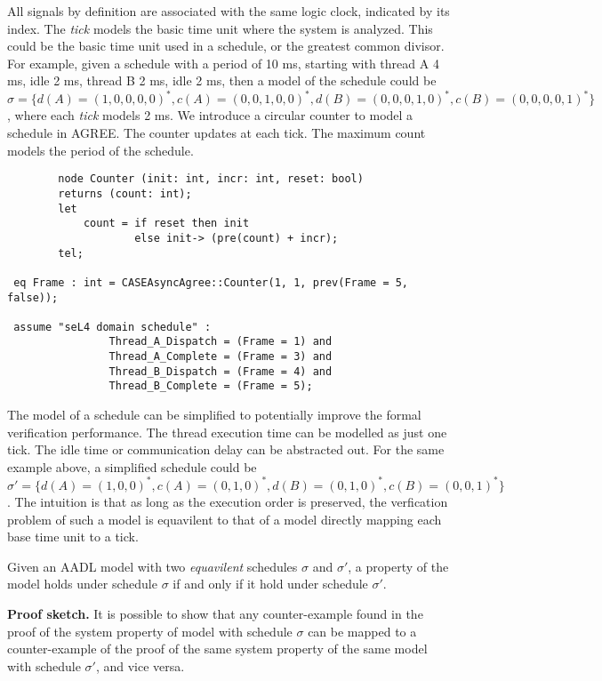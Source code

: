 All signals by definition are associated with the same logic clock, indicated by its index. The \emph{tick} models the basic time unit where the system is analyzed. This could be the basic time unit used in a schedule, or the greatest common divisor. For example, given a schedule with a period of 10 ms, starting with thread A 4 ms, idle 2 ms, thread B 2 ms, idle 2 ms, then a model of the schedule could be $\sigma = \{d(A)=(1,0,0,0,0)^*, c(A) = (0,0,1,0,0)^*, d(B) = (0,0,0,1,0)^*, c(B) = (0,0,0,0,1)^*\}$, where each \emph{tick} models 2 ms. We introduce a circular counter to model a schedule in AGREE. The counter updates at each tick. The maximum count models the period of the schedule. 
\begin{verbatim}
		node Counter (init: int, incr: int, reset: bool)	
		returns (count: int);
		let
			count = if reset then init
					else init-> (pre(count) + incr);
		tel;
		
 eq Frame : int = CASEAsyncAgree::Counter(1, 1, prev(Frame = 5, false));

 assume "seL4 domain schedule" :
				Thread_A_Dispatch = (Frame = 1) and
				Thread_A_Complete = (Frame = 3) and					
				Thread_B_Dispatch = (Frame = 4) and	
				Thread_B_Complete = (Frame = 5);	
\end{verbatim}		

The model of a schedule can be simplified to potentially improve the formal verification performance. The thread execution time can be modelled as just one tick. The idle time or communication delay can be abstracted out. For the same example above, a simplified schedule could be  $\sigma' = \{d(A)=(1,0,0)^*, c(A) = (0,1,0)^*, d(B) = (0,1,0)^*, c(B) = (0,0,1)^*\}$. The intuition is that as long as the execution order is preserved, the verfication problem of such a model is equavilent to that of a model directly mapping each base time unit to a tick. 
	
\begin{theorem}
Given an AADL model with two \emph{equavilent} schedules $\sigma$ and $\sigma'$, a property of the model holds under schedule $\sigma$ if and only if it hold under schedule $\sigma'$.
\end{theorem}

{\bf Proof sketch.} 
It is possible to show that any counter-example found in the proof of the system property of model with schedule $\sigma$ can be mapped to a counter-example of the proof of the same system property of the same model with schedule $\sigma'$,  and vice versa.  

